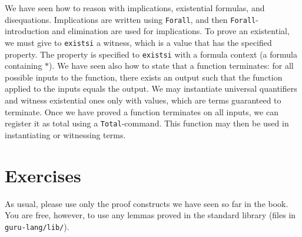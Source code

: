 \documentclass{book}[12pt]
\begin{document}
We have seen how to reason with implications, existential formulas,
and disequations.  Implications are written using \texttt{Forall}, and
then \texttt{Forall}-introduction and elimination are used for
implications.  To prove an existential, we must give to
\texttt{existsi} a witness, which is a value that has the specified
property.  The property is specified to \texttt{existsi} with a
formula context (a formula containing $*$).  We have seen also how to
state that a function terminates: for all possible inputs to the
function, there exists an output such that the function applied to the
inputs equals the output.  We may instantiate universal quantifiers
and witness existential ones only with values, which are terms
guaranteed to terminate.  Once we have proved a function terminates on
all inputs, we can register it as total using a
\texttt{Total}-command.  This function may then be used in
instantiating or witnessing terms.  

\section{Exercises}

As usual, please use only the proof constructs we have seen so far in
the book.  You are free, however, to use any lemmas proved in the
standard library (files in \texttt{guru-lang/lib/}).
\end{document}
